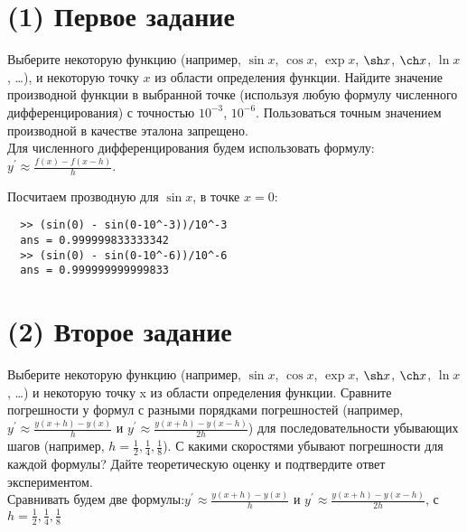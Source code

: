 \maketitle
\tableofcontents
\newpage
\section{(1) Первое задание}
Выберите некоторую функцию (например, $\sin x$, $\cos x$, $\exp x$, $\sh x$, $\ch x$, $\ln x$, \ldots), и некоторую точку $x$ из области определения функции. Найдите значение производной функции в выбранной точке (используя любую формулу численного дифференцирования) с точностью $10^{-3}$, $10^{-6}$. Пользоваться точным значением производной в качестве эталона запрещено.\\[5mm]

Для численного дифференцирования будем использовать формулу: $y^{'} \approx \frac{f(x) - f(x-h)}{h}$.

Посчитаем прозводную для $\sin x$, в точке $x = 0$:
\begin{lstlisting}
  >> (sin(0) - sin(0-10^-3))/10^-3
  ans = 0.999999833333342
  >> (sin(0) - sin(0-10^-6))/10^-6
  ans = 0.999999999999833
\end{lstlisting}

\section{(2) Второе задание}
Выберите некоторую функцию (например, $\sin x$, $\cos x$, $\exp x$, $\sh x$, $\ch x$, $\ln x$, \ldots) и некоторую точку x из области определения функции. Сравните погрешности у формул с разными порядками погрешностей (например, $y^{'} \approx \frac{y(x+h) - y(x)}{h}$ и $y^{'} \approx \frac{y(x+h) - y(x-h)}{2h}$) для последовательности убывающих шагов (например, $h = \frac{1}{2}, \frac{1}{4}, \frac{1}{8}$). С какими скоростями убывают погрешности для каждой формулы? Дайте теоретическую оценку и подтвердите ответ экспериментом.\\[5mm]

Сравнивать будем две формулы:$y^{'} \approx \frac{y(x+h) - y(x)}{h}$ и $y^{'} \approx \frac{y(x+h) - y(x-h)}{2h}$, с $h = \frac{1}{2}, \frac{1}{4}, \frac{1}{8}$
